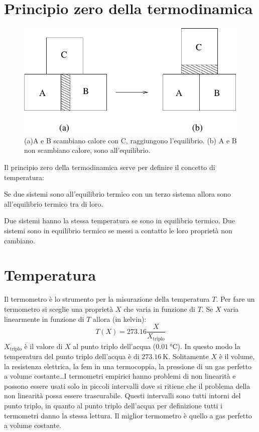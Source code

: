 \section{Principio zero della termodinamica}
\begin{figure}[htbp]
   \centering
   \includegraphics[scale=0.5]{immagini/fisica1/principio_zero}
   \caption{(a)A e B scambiano calore con C, raggiungono l'equilibrio. (b) A e B non scambiano calore, sono all'equilibrio.}
\end{figure}
Il principio zero della termodinamica serve per definire il concetto di temperatura:
\begin{Pri}
   Se due sistemi sono all'equilibrio termico con un terzo sistema allora sono all'equilibrio termico tra di loro.

   Due sistemi hanno la stessa temperatura se sono in equilibrio termico. Due sistemi sono in equilibrio termico se messi a contatto le loro proprietà non cambiano.
\end{Pri}

\section{Temperatura}
Il termometro è lo strumento per la misurazione della temperatura $T$. Per fare un termometro si sceglie una proprietà $X$ che varia in funzione di $T$. Se $X$ varia linearmente in funzione di $T$ allora (in kelvin):
\begin{equation}
   T(X)=273.16\frac{X}{X_\text{triplo}}
\end{equation}
$X_\text{triplo}$ è il valore di $X$ al punto triplo dell'acqua ($\SI{0.01}{\celsius}$). In questo modo la temperatura del punto triplo dell'acqua è di $\SI{273.16}{\kelvin}$. Solitamente $X$ è il volume, la resistenza elettrica, la fem in una termocoppia, la pressione di un gas perfetto a volume costante\ldots I termometri empirici hanno problemi di non linearità e possono essere usati solo in piccoli intervalli dove si ritiene che il problema della non linearità possa essere trascurabile. Questi intervalli sono tutti intorni del punto triplo, in quanto al punto triplo dell'acqua per definizione tutti i termometri danno la stessa lettura. Il miglior termometro è quello a gas perfetto a volume costante.

